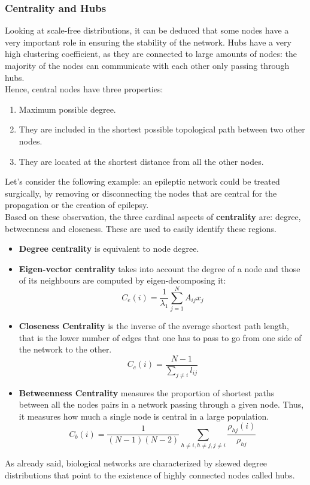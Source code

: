 \subsubsection{Centrality and Hubs}
Looking at scale-free distributions, it can be deduced that some nodes have a very important role in ensuring the
stability of the network. Hubs have a very high clustering coefficient, as they are connected to large amounts of nodes:
the majority of the nodes can communicate with each other only passing through hubs.\\
Hence, central nodes have three properties:
\begin{enumerate}
    \item Maximum possible degree.
    \item They are included in the shortest possible topological path between two other nodes.
    \item They are located at the shortest distance from all the other nodes.
\end{enumerate}
Let's consider the following example: an epileptic network could be treated surgically, by removing or disconnecting the
nodes that are central for the propagation or the creation of epilepsy.\\
Based on these observation, the three cardinal aspects of \textbf{centrality} are: degree, betweenness and closeness.
These are used to easily identify these regions.
\begin{itemize}
    \item \textbf{Degree centrality} is equivalent to node degree.
    \item \textbf{Eigen-vector centrality} takes into account the degree of a node and those of its neighbours are computed
          by eigen-decomposing it:
          \begin{equation*}
              C_e(i)=\frac{1}{\lambda_1}\sum_{j=1}^NA_{ij}x_j
          \end{equation*}
    \item \textbf{Closeness Centrality} is the inverse of the average shortest path length, that is the lower number
          of edges that one has to pass to go from one side of the network to the other.
          \begin{equation*}
              C_c(i)=\frac{N-1}{\sum_{j\neq i}l_{ij}}
          \end{equation*}
    \item \textbf{Betweenness Centrality} measures the proportion of shortest paths between all the nodes pairs in a
          network passing through a given node. Thus, it measures how much a single node is central in a large population.
          \begin{equation*}
              C_b(i)=\frac{1}{(N-1)(N-2)}\sum_{h\neq i,h\neq j, j\neq i} \frac{\rho_{hj}(i)}{\rho_{hj}}
          \end{equation*}
\end{itemize}
As already said, biological networks are characterized by skewed degree distributions that point to the existence of highly
connected nodes called hubs.

